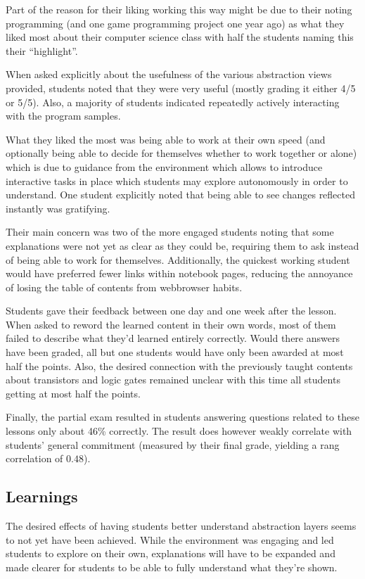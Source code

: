 Part of the reason for their liking working this way might be due to their noting programming (and one game programming project one year ago) as what they liked most about their computer science class with half the students naming this their ``highlight''.

When asked explicitly about the usefulness of the various abstraction views provided, students noted that they were very useful (mostly grading it either 4/5 or 5/5). Also, a majority of students indicated repeatedly actively interacting with the program samples.

What they liked the most was being able to work at their own speed (and optionally being able to decide for themselves whether to work together or alone) which is due to guidance from the environment which allows to introduce interactive tasks in place which students may explore autonomously in order to understand. One student explicitly noted that being able to see changes reflected instantly was gratifying.

Their main concern was two of the more engaged students noting that some explanations were not yet as clear as they could be, requiring them to ask instead of being able to work for themselves. Additionally, the quickest working student would have preferred fewer links within notebook pages, reducing the annoyance of losing the table of contents from webbrowser habits.

Students gave their feedback between one day and one week after the lesson. When asked to reword the learned content in their own words, most of them failed to describe what they'd learned entirely correctly. Would there answers have been graded, all but one students would have only been awarded at most half the points. Also, the desired connection with the previously taught contents about transistors and logic gates remained unclear with this time all students getting at most half the points.

Finally, the partial exam resulted in students answering questions related to these lessons only about 46\% correctly. The result does however weakly correlate with students' general commitment (measured by their final grade, yielding a rang correlation of $0.48$).


\subsection{Learnings}

The desired effects of having students better understand abstraction layers seems to not yet have been achieved. While the environment was engaging and led students to explore on their own, explanations will have to be expanded and made clearer for students to be able to fully understand what they're shown.

